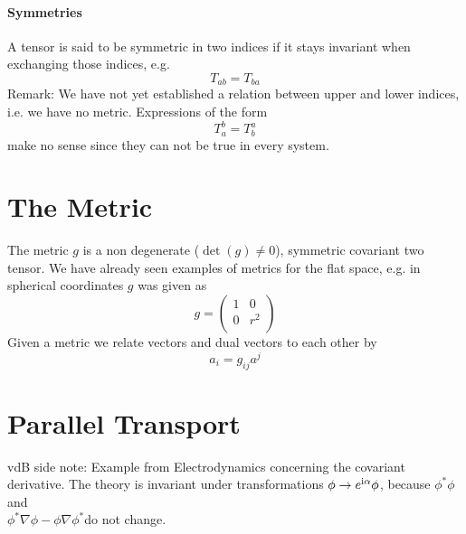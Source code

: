 \paragraph{Symmetries}
A tensor is said to be symmetric in two indices if it stays invariant when exchanging those indices, e.g.
\begin{equation}
    T_{ab}=T_{ba}
\end{equation}
Remark: We have not yet established a relation between upper and lower indices, i.e. we have no metric. Expressions of the form
\begin{equation}
    T_a^b=T_b^a
\end{equation}
make no sense since they can not be true in every system.
\section{The Metric}
The metric $g$ is a non degenerate ($\det(g)\neq 0$), symmetric covariant two tensor. We have already seen examples of metrics for the flat space, e.g. in spherical coordinates $g$ was given as
\begin{equation}
    g=\begin{pmatrix}
1 & 0\\
0 & r^2\\
\end{pmatrix}
\end{equation}
Given a metric we relate vectors and dual vectors to each other by
\begin{equation}
    a_i=g_{ij}a^j
\end{equation}
\section{Parallel Transport}
vdB side note: Example from Electrodynamics concerning the covariant derivative. The theory is invariant under transformations $\phi\to e^{\mathrm{i} \alpha}\phi$, because $\phi^*\phi$ and\\ $\phi^*\nabla\phi-\phi\nabla\phi^*$do not change.

